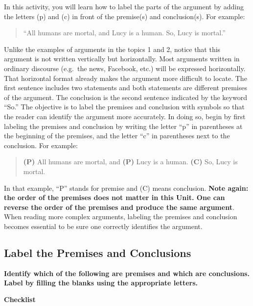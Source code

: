 \documentclass[
]{book}
\begin{document}
\begin{reflect}
In this activity, you will learn how to label the parts of the argument by adding the letters (p) and (c) in front of the premise(s) and conclusion(s). For example:

\begin{quote}
``All humans are mortal, and Lucy is a human. So, Lucy is mortal.''
\end{quote}

Unlike the examples of arguments in the topics 1 and 2, notice that this argument is not written vertically but horizontally. Most arguments written in ordinary discourse (e.g.~the news, Facebook, etc.) will be expressed horizontally. That horizontal format already makes the argument more difficult to locate. The first sentence includes two statements and both statements are different premises of the argument. The conclusion is the second sentence indicated by the keyword ``So.'' The objective is to label the premises and conclusion with symbols so that the reader can identify the argument more accurately. In doing so, begin by first labeling the premises and conclusion by writing the letter ``p'' in parentheses at the beginning of the premises, and the letter ``c'' in parentheses next to the conclusion. For example:

\begin{quote}
\textbf{(P)} All humans are mortal, and \textbf{(P)} Lucy is a human. \textbf{(C)} So, Lucy is mortal.
\end{quote}

In that example, ``P'' stands for premise and (C) means conclusion. \textbf{Note again: the order of the premises does not matter in this Unit. One can reverse the order of the premises and produce the same argument}. When reading more complex arguments, labeling the premises and conclusion becomes essential to be sure one correctly identifies the argument.

\hypertarget{label-the-premises-and-conclusions}{%
\subsection*{Label the Premises and Conclusions}\label{label-the-premises-and-conclusions}}

\textbf{Identify which of the following are premises and which are conclusions. Label by filling the blanks using the appropriate letters.}

\textbf{Checklist}


\end{reflect}
\end{document}
